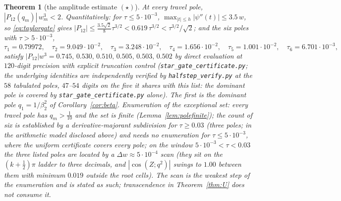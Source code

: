 \documentclass[11pt]{article}
\theoremstyle{plain}
\newtheorem{theorem}{Theorem}
\theoremstyle{definition}
\theoremstyle{remark}
\begin{document}
\begin{theorem}[the amplitude estimate $(\star)$]\label{thm:star}
At every travel pole, $|P_{12}(q_m)|\,w_m^3<2$. Quantitatively: for $\tau\le5\cdot10^{-3}$,
$\max_{|t|\le h}|\psi''(t)|\le3.5\,w$, so \eqref{eq:taylorgate} gives
$|P_{12}|\le\tfrac{3.5\sqrt2}8\tau^{3/2}<0.619\,\tau^{3/2}<\tau^{3/2}/\sqrt2$; and the six poles
with $\tau>5\cdot10^{-3}$,
\[
 \tau_1=0.79972,\quad \tau_2=9.049\cdot10^{-2},\quad \tau_3=3.248\cdot10^{-2},\quad
 \tau_4=1.656\cdot10^{-2},\quad \tau_5=1.001\cdot10^{-2},\quad \tau_6=6.701\cdot10^{-3},
\]
satisfy $|P_{12}|w^3=0.745,\,0.530,\,0.510,\,0.505,\,0.503,\,0.502$ by direct evaluation at
$120$-digit precision with explicit truncation control (\texttt{star\_gate\_certificate.py}; the
underlying identities are independently verified by \texttt{halfstep\_verify.py} at the $58$
tabulated poles, $47$--$54$ digits on the five it shares with this list: the dominant pole is
covered by \texttt{star\_gate\_certificate.py} alone). The first is the dominant pole $q_1=1/\beta_2^2$ of
Corollary~\ref{cor:beta}. Enumeration of the exceptional set: every travel pole has
$q_m>\tfrac1{10}$ and the set is finite (Lemma~\ref{lem:polefinite}); the count of six is
established by a derivative-majorant subdivision for $\tau\ge0.03$ (three poles; in the arithmetic
model disclosed above) and needs no enumeration for $\tau\le5\cdot10^{-3}$, where the uniform
certificate covers every pole; on the window $5\cdot10^{-3}<\tau<0.03$ the three listed poles are
located by a $\Delta w\approx5\cdot10^{-4}$ scan (they sit on the $(k+\tfrac12)\pi$ ladder to three
decimals, and $|\cos(Z;q^2)|$ swings to $1.00$ between them with minimum $0.019$ outside the root
cells). The scan is the weakest step of the enumeration and is stated as such; transcendence in
Theorem~\ref{thm:U} does not consume it.
\end{theorem}
\end{document}
